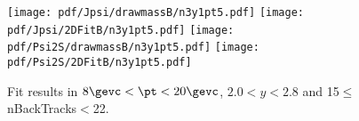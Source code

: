 \begin{figure}[H]
\begin{center}
\texttt{[image: pdf/Jpsi/drawmassB/n3y1pt5.pdf]}
\texttt{[image: pdf/Jpsi/2DFitB/n3y1pt5.pdf]}
\vspace*{-0.5cm}
\texttt{[image: pdf/Psi2S/drawmassB/n3y1pt5.pdf]}
\texttt{[image: pdf/Psi2S/2DFitB/n3y1pt5.pdf]}
\vspace*{-0.5cm}
\end{center}
\caption{Fit results in $8\gevc<\pt<20\gevc$, $2.0<y<2.8$ and 15$\leq$nBackTracks$<$22.}
\label{Fitn3y1pt5}
\end{figure}
